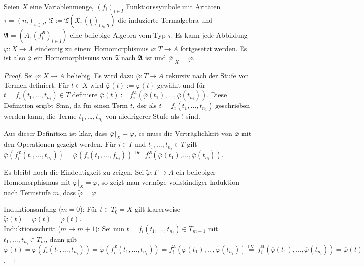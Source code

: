 \begin{theorem}\label{theorem:variablenmenge_frei}
    Seien $X$ eine Variablenmenge, $(f_i)_{i \in I}$ Funktionssymbole mit Aritäten $\tau = (n_i)_{i \in I}$, $\mathfrak{T} := \mathfrak{T(X, (f_i)_{i \in I})}$ die induzierte Termalgebra und $\mathfrak{A} = (A, (f_i^\mathfrak{A})_{i \in I})$ eine beliebige Algebra vom Typ $\tau$.
    Es kann jede Abbildung $\varphi: X \to A$ eindeutig zu einem Homomorphismus $\overline{\varphi}: T \to A$ fortgesetzt werden. Es ist also  $\overline{\varphi}$ ein Homomorphismus von $\mathfrak{T}$ nach $\mathfrak{A}$ ist und $\overline{\varphi}\vert_X = \varphi$.
\end{theorem}
\begin{proof}
    Sei $\varphi: X \to A$ beliebig. Es wird dazu $\overline{\varphi}: T \to A$ rekursiv nach der Stufe von Termen definiert. Für $t \in X$ wird $\overline{\varphi}(t) := \varphi(t)$ gewählt und für $t = f_i(t_1, \ldots, t_{n_i}) \in T$ definiere $\overline{\varphi}(t) := f_i^\mathfrak{A}(\overline{\varphi}(t_1), \ldots, \overline{\varphi}(t_{n_i}))$. Diese Definition ergibt Sinn, da für einen Term $t$, der als $t = f_i(t_1, \ldots, t_{n_1})$ geschrieben werden kann, die Terme $t_1, \ldots, t_{n_i}$ von niedrigerer Stufe als $t$ sind.

    Aus dieser Definition ist klar, dass $\overline{\varphi} \vert_X = \varphi$, es muss die Verträglichkeit von $\overline{\varphi}$ mit den Operationen gezeigt werden. Für $i \in I$ und $t_1, \ldots, t_{n_i} \in T$ gilt $\overline{\varphi}(f_i^\mathfrak{T}(t_1, \ldots, t_{n_i})) = \overline{\varphi}(f_i(t_1, \ldots, f_{n_i})) \overset{\text{Def.}}{=} f_i^\mathfrak{A}(\overline{\varphi}(t_1), \ldots, \overline{\varphi}(t_{n_i}))$. 

    Es bleibt noch die Eindeutigkeit zu zeigen. Sei $\widetilde{\varphi}: T \to A$ ein beliebiger Homomorphismus mit $\widetilde{\varphi}\vert_X = \varphi$, so zeigt man vermöge vollständiger Induktion nach Termstufe $m$, dass $\widetilde{\varphi} = \overline{\varphi}$. 
    
    Induktionsanfang ($m=0$): Für $t \in T_{0} = X$ gilt klarerweise $\widetilde{\varphi}(t) = \varphi(t) = \overline{\varphi}(t)$.\\
    Induktionsschritt ($m \to m+1$): Sei nun $t = f_i(t_{1}, \ldots, t_{n_i}) \in T_{m+1}$ mit $t_1, \ldots, t_{n_i} \in T_{m}$, dann gilt $\widetilde{\varphi}(t) = \widetilde{\varphi}(f_i(t_1, \ldots, t_{n_i})) = \widetilde{\varphi}(f_i^\mathfrak{T}(t_1, \ldots, t_{n_i})) = f_i^\mathfrak{A}(\widetilde{\varphi}(t_1), \ldots, \widetilde{\varphi}(t_{n_i})) \overset{\text{I.V.}}{=} f_i^\mathfrak{A}(\overline{\varphi}(t_1), \ldots, \overline{\varphi}(t_{n_i})) = \overline{\varphi}(t) $.
\end{proof}

